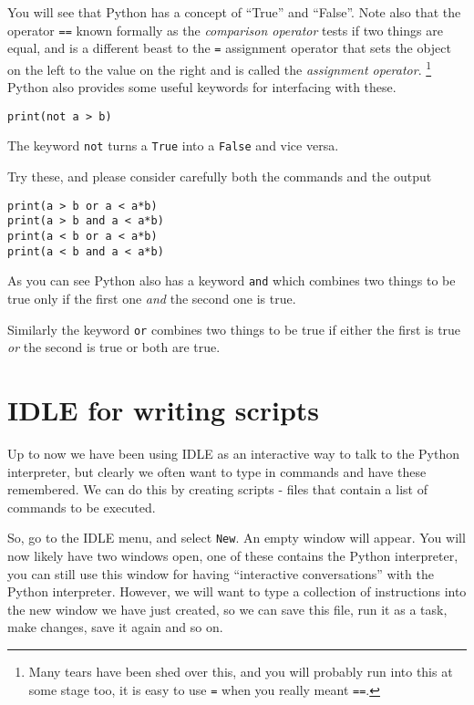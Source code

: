 \documentclass[12pt,oneside]{cttutorial}
\begin{document}
You will see that Python has a concept of ``True'' and ``False''. Note also that the operator \lstinline!==! known formally as the \emph{comparison operator} tests if two things are equal, and is a different beast to the \lstinline!=! assignment operator that sets the object on the left to the value on the right and is called the \emph{assignment operator}.
\footnote{Many tears have been shed over this, and you will probably run into this at some stage too, it is easy to use \lstinline!=! when you really meant \lstinline!==!.}
Python also provides some useful keywords
for interfacing with these.

\begin{lstlisting}
print(not a > b)
\end{lstlisting}

The keyword \lstinline!not! turns a \lstinline!True! into a \lstinline!False! and vice versa.

Try these, and please consider carefully both the commands and the output

\begin{lstlisting}
print(a > b or a < a*b)
print(a > b and a < a*b)
print(a < b or a < a*b)
print(a < b and a < a*b)
\end{lstlisting}

As you can see Python also has a keyword \lstinline!and! which combines two things to be true only if the first one \emph{and} the second one is true.

Similarly the keyword \lstinline!or! combines two things to be true if either the first is true \emph{or} the second is true {or} both are true.

\section{IDLE for writing scripts}

Up to now we have been using IDLE as an interactive way to talk to the Python interpreter, but clearly we often want to type in commands
and have these remembered. We can do this by creating scripts - files that contain a list of commands to be executed.


So, go to the IDLE menu, and select \lstinline!New!. An empty window will appear. You will now likely have two windows open, one of these contains the Python interpreter, you can still use this window for having ``interactive conversations'' with the Python interpreter. However, we will want to type a collection of instructions into the new window we have just created, so we can save this file, run it as a task, make changes, save it again and so on.
\end{document}
